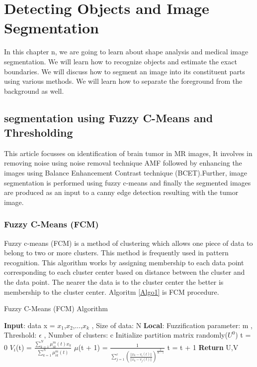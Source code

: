 \chapter{Detecting Objects and Image Segmentation}
\label{sec:chap7}


In this chapter n, we are going to learn about shape analysis and medical image segmentation. We will learn how to recognize objects and estimate the exact boundaries. We will discuss how to segment an image into its constituent parts using various methods. We will learn how to separate the foreground from the background as well.

\section{segmentation using Fuzzy C-Means and Thresholding}
This article focusses on identification of brain tumor in MR images, It involves in removing noise using noise removal technique AMF followed by enhancing the images using Balance Enhancement Contrast technique (BCET).Further, image segmentation is performed using fuzzy c-means and finally the segmented images are produced as an input to a canny edge detection resulting with the tumor image.

\subsection{Fuzzy C-Means (FCM)}
Fuzzy c-means (FCM) is a method of clustering which allows one piece of
data to belong to two or more clusters. This method is frequently used in pattern
recognition. This algorithm works by assigning membership to each data point
corresponding to each cluster center based on distance between the cluster and the
data point. The nearer the data is to the cluster center the better is membership to
the cluster center. Algoritm \ref{Algo1} is FCM procedure. 

\begin{algorithm}[htbp]
	\caption{Fuzzy C-Means (FCM) Algorithm}
	\label{Algo1}
	\begin{spacing}{1.5}
		\begin{algorithmic}[1]
			\State \textbf{Input}: data x = {$x_1$,$x_2$,...,$x_k$} , Size of data: N
			\State \textbf{Local}: Fuzzification parameter: m , Threshold: $\epsilon$ , Number of clusters: c
			\State Initialize partition matrix randomly($U^0$)
			\State t = 0
			\Repeat
			\State $V_i$(t) = $\frac{\sum_{k=1}^{N}\mu_{ik}^m(t) x_k}{\sum_{k=1}^{N}\mu_{ik}^m(t)}$
			\EndFor
			\State $\mu$(t + 1) = $\frac{1}{\sum_{j=1}^{c}(\frac{|| x_k - v_i(t) ||}{|| x_k - v_j(t) ||})^\frac{2}{m-1}}$
			\EndFor
			\EndFor
			\State t = t + 1
			\State \textbf{Return} U,V
		\end{algorithmic}
	\end{spacing}
\end{algorithm}

